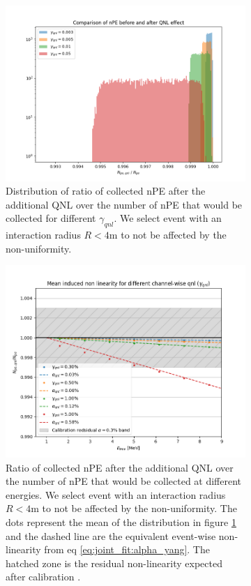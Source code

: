 \documentclass[../main.tex]{subfiles}
\begin{document}
\begin{figure}
  \centering
  \begin{subfigure}[t]{0.48\linewidth}
    \includegraphics[width=\linewidth]{images/joint_fit/gamma_eff.png}
    \caption{Distribution of ratio of collected nPE after the additional QNL over the number of nPE that would be collected for different $\gamma_{qnl}$. We select event with an interaction radius $R < 4$m to not be affected by the non-uniformity.}
    \label{fig:joint_fit:ratio_distrib}
  \end{subfigure}
  \hfill
  \begin{subfigure}[t]{0.48\linewidth}
    \includegraphics[width=\linewidth]{images/joint_fit/gamma_to_alpha.png}
    \caption{Ratio of collected nPE after the additional QNL over the number of nPE that would be collected at different energies. We select event with an interaction radius $R < 4$m to not be affected by the non-uniformity. The dots represent the mean of the distribution in figure \ref{fig:joint_fit:ratio_distrib} and the dashed line are the equivalent event-wise non-linearity from eq \ref{eq:joint_fit:alpha_yang}. The hatched zone is the residual non-linearity expected after calibration \cite{juno_collaboration_calibration_2021}.}
    \label{fig:joint_fit:gamma_v_alpha}
  \end{subfigure}
  \caption{}
\end{figure}
\end{document}
